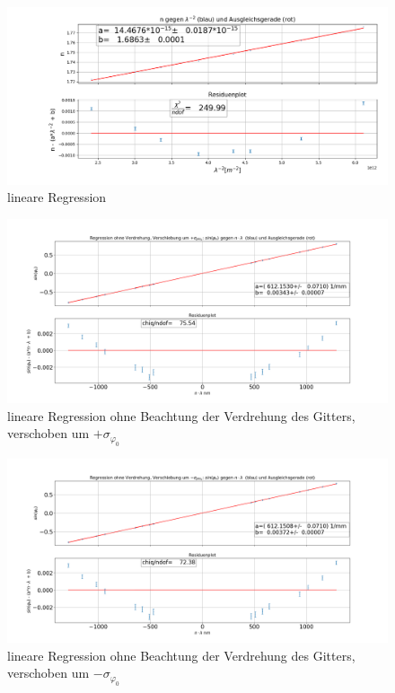 \documentclass[a4paper, 11pt]{article}
\begin{document}
\begin{figure}[H]
	\centering
	\hskip -2cm
	\includegraphics[trim = 0mm 0mm 0mm 0mm,clip,scale=0.5]{Bilder/lineare_fit.png}%
	\caption[lineare Regression]{lineare Regression}%
	\label{pic:Abbildung 1}%
\end{figure}

\begin{figure}[H]
	\hskip-2.5cm
	\includegraphics[scale=0.45]{./Bilder/Gitter_Regression_ohne_Verdrehung_+.png}
	\caption{lineare Regression ohne Beachtung der Verdrehung des Gitters, verschoben um $+ \sigma_{\varphi_0}$}
	\label{pic:linReg_1_+}	
\end{figure}

\begin{figure}[H]
	\hskip-2.5cm
	\includegraphics[scale=0.45]{./Bilder/Gitter_Regression_ohne_Verdrehung_-.png}
	\caption{lineare Regression ohne Beachtung der Verdrehung des Gitters, verschoben um $- \sigma_{\varphi_0}$}
	\label{pic:linReg_1_-}	
\end{figure}
\end{document}
